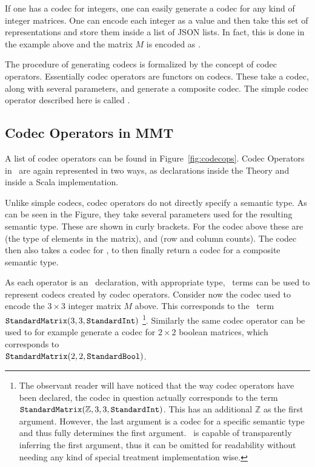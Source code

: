 If one has a codec for integers, one can easily generate a codec for any kind of integer matrices. 
One can encode each integer as a value and then take this set of representations and store them inside a list of JSON lists.
In fact, this is done in the example above and the matrix $M$ is encoded as \inlinecode{[[1.0,5.0,25.0],[5.0,1.0,5.0],[25.0,5.0,1.0]]}. 

The procedure of generating codecs is formalized by the concept of codec operators. 
Essentially codec operators are functors on codecs. 
These take a codec, along with several parameters, and generate a composite codec. 
The simple codec operator described here is called . 

\subsection{Codec Operators in MMT}\label{sec:vt:operatormmt}

%
A list of codec operators can be found in Figure~\ref{fig:codecops}. 
Codec Operators in \mmt\ are again represented in two ways, as declarations inside the  Theory and inside a Scala implementation. 

Unlike simple codecs, codec operators do not directly specify a semantic type. 
As can be seen in the Figure, they take several parameters used for the resulting semantic type. 
These are shown in curly brackets. 
For the  codec above these are  (the type of elements in the matrix),  and  (row and column counts).
The codec then also takes a codec for , to then finally return a codec for a composite semantic type. 

As each operator is an \mmt\ declaration, with appropriate type, \mmt\ terms can be used to represent codecs created by codec operators. 
Consider now the codec used to encode the $3 \times 3$ integer matrix $M$ above. 
This corresponds to the \mmt\ term \\$\plaintt{StandardMatrix}(3, 3, \plaintt{StandardInt})$ \footnote{
  The observant reader will have noticed that the way codec operators have been declared, the codec in question actually corresponds to the term $\plaintt{StandardMatrix}(\mathbb{Z}, 3, 3, \plaintt{StandardInt})$. 
  This has an additional $\mathbb{Z}$ as the first argument. 
  However, the last argument is a codec for a specific semantic type and thus fully determines the first argument. 
  \mmt\ is capable of transparently inferring the first argument, thus it can be omitted for readability without needing any kind of special treatment implementation wise.  
}. 
Similarly the same codec operator can be used to for example generate a codec for $2 \times 2$ boolean matrices, which corresponds to 
\\$\plaintt{StandardMatrix}(2, 2, \plaintt{StandardBool})$. 

